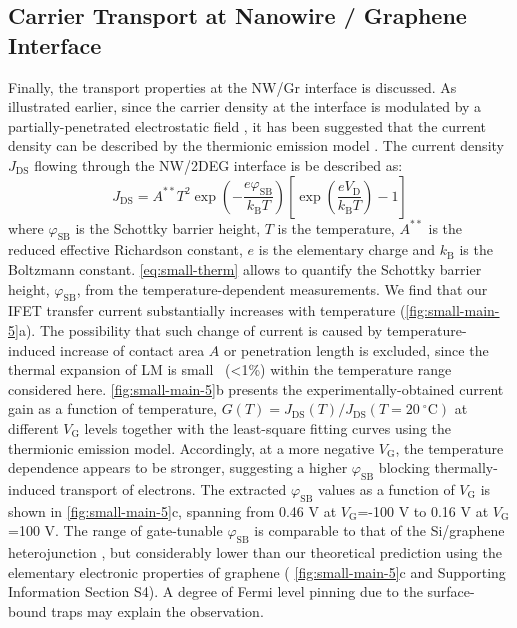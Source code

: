\subsection{Carrier Transport at Nanowire / Graphene Interface}
\label{sec:small-carrier-transport}

Finally, the transport properties at the NW/Gr
interface is discussed. As illustrated earlier, since the carrier density at the
interface is modulated by a partially-penetrated electrostatic field
, it has been suggested that the current
density can be described by the thermionic emission model
\cite{Sze_2006_Mosfets}.
%
The current density $J_{\mathrm{DS}}$ flowing
through the NW/2DEG interface is be described as:
\begin{equation}
\label{eq:small-therm}
J_{\mathrm{DS}} = A^{**} T^{2} \exp(- \frac{e \varphi_{\mathrm{SB}}}{k_{\mathrm{B}}T}) 
                \left[ \exp(\frac{e V_{\mathrm{D}}}{k_{\mathrm{B}}T}) - 1\right]
\end{equation}
where $\varphi_{\mathrm{SB}}$ is the Schottky barrier height, \(T\) is the temperature, \(A^{**}\) is the reduced effective
Richardson constant, \(e\) is the elementary charge and \(k_{\mathrm{B}}\) is the Boltzmann
constant. 
%
\autoref{eq:small-therm} allows to quantify the Schottky barrier
height, \(\varphi_{\mathrm{SB}}\), from the temperature-dependent
measurements. We find that our IFET transfer current substantially
increases with temperature (\autoref{fig:small-main-5}a).
%
The possibility that such change of current is caused by
temperature-induced increase of contact area $A$ or penetration
length is excluded, since the thermal
expansion of LM is small~\cite{Dickey_2008_EGAIN} (\textless{}1\%) within the temperature range
considered here.
%
\autoref{fig:small-main-5}b presents the
experimentally-obtained current gain as a function of temperature,
\(G(T)=J_{\mathrm{DS}}(T)/J_{\mathrm{DS}}(T=20\ ^{\circ} \mathrm{C})\)
at different \(V_{\mathrm{G}}\) levels together with the least-square
fitting curves using the thermionic emission model. Accordingly, at a
more negative \(V_{\mathrm{G}}\), the temperature dependence appears
to be stronger, suggesting a higher \(\varphi_{\mathrm{SB}}\) blocking
thermally-induced transport of electrons. The extracted
\(\varphi_{\mathrm{SB}}\) values as a function of \(V_{\mathrm{G}}\)
is shown in \autoref{fig:small-main-5}c, spanning from 0.46 V at
\(V_{\mathrm{G}}\)=-100 V to 0.16 V at \(V_{\mathrm{G}}\)=100 V.  The
range of gate-tunable \(\varphi_{\mathrm{SB}}\) is comparable to that
of the Si/graphene heterojunction \cite{Yang_2012_Barristor}, but
considerably lower than our theoretical prediction using the
elementary electronic properties of graphene (
\autoref{fig:small-main-5}c and Supporting Information Section S4). A
degree of Fermi level pinning due to the surface-bound traps
\cite{Meric_2008_saturation_gr_FET} may explain the observation.

